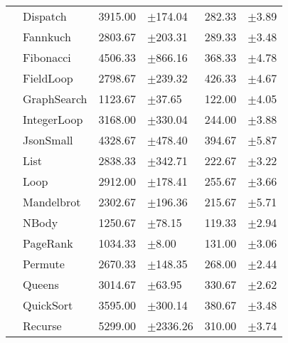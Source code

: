 \begin{tabular}{ll@{\hspace{6pt}}r@{\hspace{3pt}}l@{\hspace{6pt}}r@{\hspace{3pt}}l}
 & Dispatch & 3915.00 & \scriptsize\textcolor{gray!60}{$\pm$174.04} & 282.33 & \scriptsize\textcolor{gray!60}{$\pm$3.89} \\
 & Fannkuch & 2803.67 & \scriptsize\textcolor{gray!60}{$\pm$203.31} & 289.33 & \scriptsize\textcolor{gray!60}{$\pm$3.48} \\
 & Fibonacci & 4506.33 & \scriptsize\textcolor{gray!60}{$\pm$866.16} & 368.33 & \scriptsize\textcolor{gray!60}{$\pm$4.78} \\
 & FieldLoop & 2798.67 & \scriptsize\textcolor{gray!60}{$\pm$239.32} & 426.33 & \scriptsize\textcolor{gray!60}{$\pm$4.67} \\
 & GraphSearch & 1123.67 & \scriptsize\textcolor{gray!60}{$\pm$37.65} & 122.00 & \scriptsize\textcolor{gray!60}{$\pm$4.05} \\
 & IntegerLoop & 3168.00 & \scriptsize\textcolor{gray!60}{$\pm$330.04} & 244.00 & \scriptsize\textcolor{gray!60}{$\pm$3.88} \\
 & JsonSmall & 4328.67 & \scriptsize\textcolor{gray!60}{$\pm$478.40} & 394.67 & \scriptsize\textcolor{gray!60}{$\pm$5.87} \\
 & List & 2838.33 & \scriptsize\textcolor{gray!60}{$\pm$342.71} & 222.67 & \scriptsize\textcolor{gray!60}{$\pm$3.22} \\
 & Loop & 2912.00 & \scriptsize\textcolor{gray!60}{$\pm$178.41} & 255.67 & \scriptsize\textcolor{gray!60}{$\pm$3.66} \\
 & Mandelbrot & 2302.67 & \scriptsize\textcolor{gray!60}{$\pm$196.36} & 215.67 & \scriptsize\textcolor{gray!60}{$\pm$5.71} \\
 & NBody & 1250.67 & \scriptsize\textcolor{gray!60}{$\pm$78.15} & 119.33 & \scriptsize\textcolor{gray!60}{$\pm$2.94} \\
 & PageRank & 1034.33 & \scriptsize\textcolor{gray!60}{$\pm$8.00} & 131.00 & \scriptsize\textcolor{gray!60}{$\pm$3.06} \\
 & Permute & 2670.33 & \scriptsize\textcolor{gray!60}{$\pm$148.35} & 268.00 & \scriptsize\textcolor{gray!60}{$\pm$2.44} \\
 & Queens & 3014.67 & \scriptsize\textcolor{gray!60}{$\pm$63.95} & 330.67 & \scriptsize\textcolor{gray!60}{$\pm$2.62} \\
 & QuickSort & 3595.00 & \scriptsize\textcolor{gray!60}{$\pm$300.14} & 380.67 & \scriptsize\textcolor{gray!60}{$\pm$3.48} \\
 & Recurse & 5299.00 & \scriptsize\textcolor{gray!60}{$\pm$2336.26} & 310.00 & \scriptsize\textcolor{gray!60}{$\pm$3.74} \\

\end{tabular}
